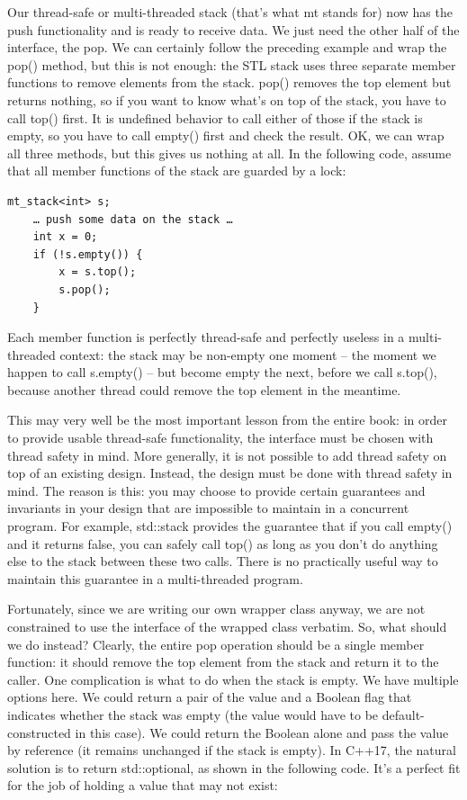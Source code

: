 Our thread-safe or multi-threaded stack (that's what mt stands for) now has the push functionality and is ready to receive data. We just need the other half of the interface, the pop. We can certainly follow the preceding example and wrap the pop() method, but this is not enough: the STL stack uses three separate member functions to remove elements from the stack. pop() removes the top element but returns nothing, so if you want to know what's on top of the stack, you have to call top() first. It is undefined behavior to call either of those if the stack is empty, so you have to call empty() first and check the result. OK, we can wrap all three methods, but this gives us nothing at all. In the following code, assume that all member functions of the stack are guarded by a lock:

\begin{lstlisting}[style=styleCXX]
	mt_stack<int> s;
	… push some data on the stack …
	int x = 0;
	if (!s.empty()) {
		x = s.top();
		s.pop();
	}
\end{lstlisting}

Each member function is perfectly thread-safe and perfectly useless in a multi-threaded context: the stack may be non-empty one moment – the moment we happen to call s.empty() – but become empty the next, before we call s.top(), because another thread could remove the top element in the meantime.

This may very well be the most important lesson from the entire book: in order to provide usable thread-safe functionality, the interface must be chosen with thread safety in mind. More generally, it is not possible to add thread safety on top of an existing design. Instead, the design must be done with thread safety in mind. The reason is this: you may choose to provide certain guarantees and invariants in your design that are impossible to maintain in a concurrent program. For example, std::stack provides the guarantee that if you call empty() and it returns false, you can safely call top() as long as you don't do anything else to the stack between these two calls. There is no practically useful way to maintain this guarantee in a multi-threaded program.

Fortunately, since we are writing our own wrapper class anyway, we are not constrained to use the interface of the wrapped class verbatim. So, what should we do instead? Clearly, the entire pop operation should be a single member function: it should remove the top element from the stack and return it to the caller. One complication is what to do when the stack is empty. We have multiple options here. We could return a pair of the value and a Boolean flag that indicates whether the stack was empty (the value would have to be default-constructed in this case). We could return the Boolean alone and pass the value by reference (it remains unchanged if the stack is empty). In C++17, the natural solution is to return std::optional, as shown in the following code. It's a perfect fit for the job of holding a value that may not exist:

